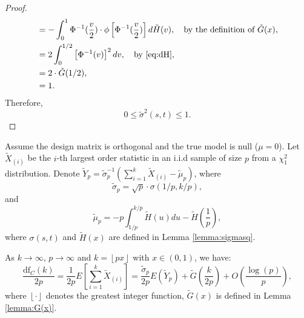 \begin{proof}
\begin{equation*}
\begin{aligned}
	&= -\int_{0}^{1} \Phi^{-1}(\frac{v}{2})\cdot \phi\left[\Phi^{-1}(\frac{v}{2})\right]d\tilde{H}(v),\quad \text{by the definition of $\tilde{G}(x)$},\\
	&= 2\int_{0}^{1/2} \left[\Phi^{-1}(v)\right]^2 dv, \quad \text{by \eqref{eq:dH}},\\
	&=2\cdot \tilde{G}(1/2),\\
	&=1.
	\end{aligned}
	\end{equation*}
	Therefore,
	\begin{equation*}
	0 \le \tilde{\sigma}^2(s,t) \le 1.
	\end{equation*}
\end{proof}




\begin{theorem}
	\label{thm:ydf_representation}
	Assume the design matrix is orthogonal and the true model is null ($\mu=0$). Let $\tilde{X}_{(i)}$ be the $i$-th largest order statistic in an i.i.d sample of size $p$ from a $\chi^2_1$ distribution. Denote $\tilde{Y}_p = \tilde{\sigma}_p^{-1}(\sum_{i=1}^k \tilde{X}_{(i)} - \tilde{\mu}_p)$, where
	\begin{equation*}
	\tilde{\sigma}_p = \sqrt{p} \cdot \sigma(1/p,k/p),
	\end{equation*}
	and
	\begin{equation*}
	\tilde{\mu}_p = -p \int_{1/p}^{k/p} \tilde{H}(u) du - \tilde{H}(\frac{1}{p}),
	\end{equation*}
	where $\sigma(s,t)$ and $\tilde{H}(x)$ are defined in Lemma \ref{lemma:sigmasq}.
	
	As $k \to \infty$, $p \to \infty$ and $k=\left \lfloor{px}\right \rfloor$ with $x \in (0,1)$, we have:
	\begin{equation}
	\frac{\text{df}_C(k)}{2p} = \frac{1}{2p} E\left[ \sum_{i=1}^k \tilde{X}_{(i)} \right]=  \frac{\tilde{\sigma}_p}{2p}E(\tilde{Y}_p) + \tilde{G}(\frac{k}{2p}) + O\left(\frac{\log(p)}{p}\right),
	\label{eq:ydf/2p_representation}
	\end{equation}
	where $\left \lfloor{\cdot}\right \rfloor$ denotes the greatest integer function, $\tilde{G}(x)$ is defined in Lemma \ref{lemma:G(x)}.
	
\end{theorem}
